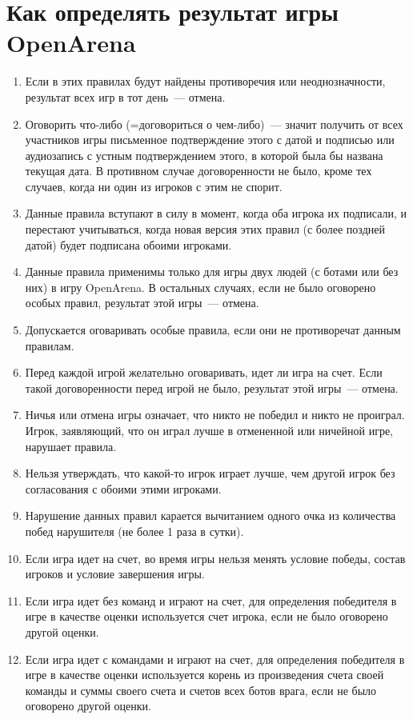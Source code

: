 \documentclass[a4paper,titlepage,12pt]{article}
\begin{document}
{\center\section*{Как определять результат игры OpenArena}}

\thispagestyle{empty}

\begin{enumerate}
\item Если в этих правилах будут найдены противоречия или неоднозначности,
    результат всех игр в тот день~--- отмена.
\item Оговорить что-либо (=договориться о чем-либо)~---
    значит получить от всех участников игры
    письменное подтверждение этого с датой и подписью
    или аудиозапись с устным подтверждением этого,
    в которой была бы названа текущая дата.
    В противном случае договоренности не было,
    кроме тех случаев, когда ни один из игроков с этим не спорит.
\item Данные правила вступают в силу в момент, когда оба игрока
    их подписали, и перестают учитываться, когда новая версия этих правил
    (с более поздней датой) будет подписана обоими игроками.
\item Данные правила применимы только для игры двух людей
    (с ботами или без них) в игру OpenArena.
    В остальных случаях, если не было оговорено особых правил,
    результат этой игры~--- отмена.
\item Допускается оговаривать особые правила, если они не противоречат
    данным правилам.
\item Перед каждой игрой желательно оговаривать, идет ли игра на счет.
    Если такой договоренности перед игрой не было,
    результат этой игры~--- отмена.
\item Ничья или отмена игры означает, что никто не победил и никто не проиграл.
    Игрок, заявляющий, что он играл лучше в отмененной или ничейной игре,
    нарушает правила.
\item Нельзя утверждать, что какой-то игрок играет лучше, чем другой игрок
    без согласования с обоими этими игроками.
\item Нарушение данных правил карается вычитанием одного очка из
    количества побед нарушителя (не более 1 раза в сутки).
\item Если игра идет на счет, во время игры нельзя менять условие победы,
    состав игроков и условие завершения игры.
\item Если игра идет без команд и играют на счет, для определения
    победителя в игре в качестве оценки используется счет игрока,
    если не было оговорено другой оценки.
\item Если игра идет с командами и играют на счет, для определения
    победителя в игре в качестве оценки используется корень из
    произведения счета своей команды и суммы своего счета и счетов
    всех ботов врага, если не было оговорено другой оценки.


\end{enumerate}
\end{document}
